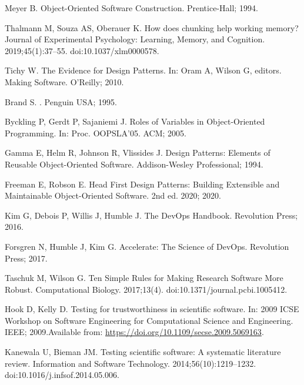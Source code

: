 \documentclass[10pt,letterpaper]{article}
\begin{document}
\begin{thebibliography}{10}
Meyer B.
\newblock Object-Oriented Software Construction.
\newblock Prentice-Hall; 1994.

Thalmann M, Souza AS, Oberauer K.
\newblock How does chunking help working memory?
\newblock Journal of Experimental Psychology: Learning, Memory, and Cognition.
  2019;45(1):37--55.
\newblock doi:{10.1037/xlm0000578}.

Tichy W.
\newblock The Evidence for Design Patterns.
\newblock In: Oram A, Wilson G, editors. Making Software. O'Reilly; 2010.

Brand S.
.
\newblock Penguin USA; 1995.

Byckling P, Gerdt P, Sajaniemi J.
\newblock Roles of Variables in Object-Oriented Programming.
\newblock In: Proc. {OOPSLA'05}. {ACM}; 2005.

Gamma E, Helm R, Johnson R, Vlissides J.
\newblock Design Patterns: Elements of Reusable Object-Oriented Software.
\newblock Addison-Wesley Professional; 1994.

Freeman E, Robson E.
\newblock Head First Design Patterns: Building Extensible and Maintainable
  Object-Oriented Software.
\newblock 2nd ed. 2020; 2020.

Kim G, Debois P, Willis J, Humble J.
\newblock The {DevOps} Handbook.
 Revolution Press; 2016.

Forsgren N, Humble J, Kim G.
\newblock Accelerate: The Science of DevOps.
 Revolution Press; 2017.

Taschuk M, Wilson G.
\newblock Ten Simple Rules for Making Research Software More Robust.
 Computational Biology. 2017;13(4).
\newblock doi:{10.1371/journal.pcbi.1005412}.

Hook D, Kelly D.
\newblock Testing for trustworthiness in scientific software.
\newblock In: 2009 {ICSE} Workshop on Software Engineering for Computational
  Science and Engineering. {IEEE}; 2009.Available from:
  \url{https://doi.org/10.1109/secse.2009.5069163}.

Kanewala U, Bieman JM.
\newblock Testing scientific software: A systematic literature review.
\newblock Information and Software Technology. 2014;56(10):1219--1232.
\newblock doi:{10.1016/j.infsof.2014.05.006}.


\end{thebibliography}
\end{document}
